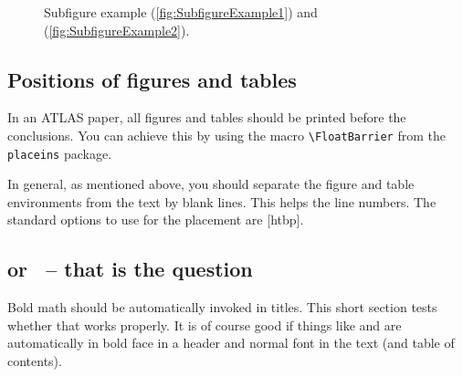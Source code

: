 \documentclass[UKenglish]{latex/atlasdoc}
\newcommand{\Macro}[1]{\texttt{\textbackslash #1}\xspace}
\newcommand{\Option}[1]{\textsf{#1}\xspace}
\newcommand{\Package}[1]{\texttt{#1}\xspace}
\begin{document}
\begin{figure}[htbp]
  \centering
  \caption{Subfigure example (\ref{fig:SubfigureExample1}) and
    (\ref{fig:SubfigureExample2}).}
  \label{fig:subfigexample}
\end{figure}


\subsection{Positions of figures and tables}

In an ATLAS paper, all figures and tables should be printed before the conclusions.
You can achieve this by using the macro \Macro{FloatBarrier} from the
\Package{placeins} package.

In general, as mentioned above, you should separate the figure and table environments from the text by blank lines.
This helps the line numbers. The standard options to use for the placement are \Option{[htbp]}.


\subsection{\pT or \ET\ -- that is the question}

Bold math should be automatically invoked in titles.
This short section tests whether that works properly.
It is of course good if things like \pT and \ET are automatically in bold face in
a header and normal font in the text (and table of contents).
\end{document}
